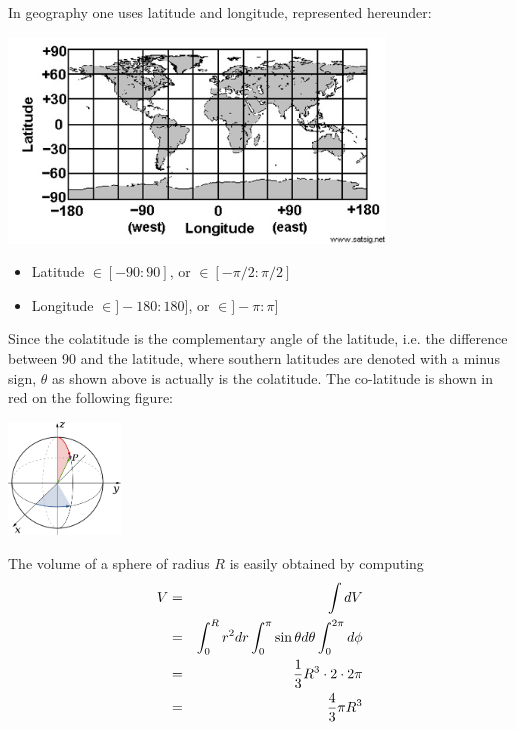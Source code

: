 In geography one uses latitude and longitude, represented hereunder:
\begin{center}
\includegraphics[width=10cm]{images/map.jpg}
\end{center}
\begin{itemize}
\item Latitude  $\in[-90:90]$,   or $\in[-\pi/2:\pi/2]$ 
\item Longitude $\in]-180:180]$, or $\in]-\pi:\pi]$ 
\end{itemize}

Since the colatitude is the complementary angle of the latitude, 
i.e. the difference between 90 and the latitude, 
where southern latitudes are denoted with a minus sign,
$\theta$ as shown above is actually is the colatitude.
The co-latitude is shown in red on the following figure:
\begin{center}
\includegraphics[width=3cm]{images/colatitude}
\end{center}

The volume of a sphere of radius $R$ is easily obtained by computing 
\begin{eqnarray}
V 
&=& \int dV \nonumber\\
&=& \int_0^R r^2 dr \int_0^\pi \sin\theta d\theta \int_0^{2\pi} d\phi  \nonumber\\
&=& \frac{1}{3}R^3  \cdot 2 \cdot 2\pi \nonumber\\
&=& \frac{4}{3}\pi R^3 
\end{eqnarray}


